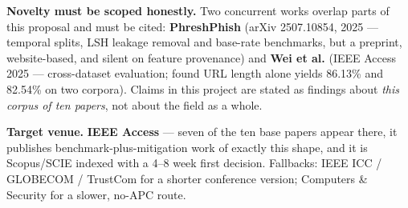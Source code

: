 \documentclass[10pt,a4paper]{article}
\begin{document}
\vspace{3mm}
\textbf{Novelty must be scoped honestly.} Two concurrent works overlap parts of this proposal and
must be cited: \textbf{PhreshPhish} (arXiv 2507.10854, 2025 --- temporal splits, LSH leakage
removal and base-rate benchmarks, but a preprint, website-based, and silent on feature provenance)
and \textbf{Wei et al.} (IEEE Access 2025 --- cross-dataset evaluation; found URL length alone
yields 86.13\% and 82.54\% on two corpora). Claims in this project are stated as findings about
\emph{this corpus of ten papers}, not about the field as a whole.

\vspace{3mm}
\textbf{Target venue.} \textbf{IEEE Access} --- seven of the ten base papers appear there, it
publishes benchmark-plus-mitigation work of exactly this shape, and it is Scopus/SCIE indexed with
a 4--8 week first decision. Fallbacks: IEEE ICC / GLOBECOM / TrustCom for a shorter conference
version; Computers \& Security for a slower, no-APC route.
\end{document}
